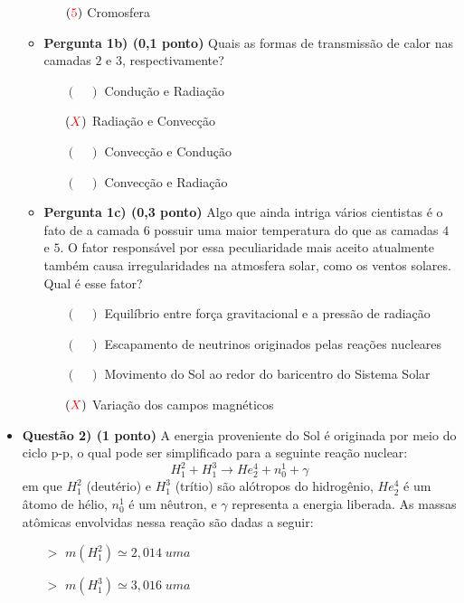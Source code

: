 \documentclass[a4paper, 12pt]{article}
\newcommand{\red}[1]{\textcolor{red}{#1}}
\begin{document}
\begin{flushleft}
\begin{itemize}
\begin{itemize}
\begin{multicols}{2}
\begin{itemize}
						\item[$(\red{5})$] Cromosfera
					\end{itemize} \end{multicols}
				\item \textbf{Pergunta 1b) (0,1 ponto)} Quais as formas de transmissão de calor nas camadas $2$ e $3$, respectivamente?
					\begin{itemize}
						\item[$(\quad)$] Condução e Radiação
						\item[$(\red{X})$] Radiação e Convecção
						\item[$(\quad)$] Convecção e Condução
						\item[$(\quad)$] Convecção e Radiação
					\end{itemize}
				\item \textbf{Pergunta 1c) (0,3 ponto)} Algo que ainda intriga vários cientistas é o fato de a camada $6$ possuir uma maior temperatura do que as camadas $4$ e $5$. O fator responsável por essa peculiaridade mais aceito atualmente também causa irregularidades na atmosfera solar, como os ventos solares. Qual é esse fator?
					\begin{itemize}
						\item[$(\quad)$] Equilíbrio entre força gravitacional e a pressão de radiação
						\item[$(\quad)$] Escapamento de neutrinos originados pelas reações nucleares
						\item[$(\quad)$] Movimento do Sol ao redor do baricentro do Sistema Solar
						\item[$(\red{X})$] Variação dos campos magnéticos
					\end{itemize}
			\end{itemize}
		\item \textbf{Questão 2) (1 ponto)} A energia proveniente do Sol é originada por meio do ciclo p-p, o qual pode ser simplificado para a seguinte reação nuclear:
			$$H_1^2 + H_1^3 \longrightarrow He_2^4 + n_0^1 + \gamma$$
			em que $H_1^2$ (deutério) e $H_1^3$ (trítio) são alótropos do hidrogênio, $He_2^4$ é um âtomo de hélio, $n_0^1$ é um nêutron, e $\gamma$ representa a energia liberada. \linebreak
			As massas atômicas envolvidas nessa reação são dadas a seguir:
				\begin{multicols}{2} \begin{itemize}
					\item[$>$] $m(H_1^2) \simeq 2,014 \; uma$
					\item[$>$] $m(H_1^3) \simeq 3,016 \; uma$

\end{itemize}
\end{multicols}
\end{itemize}
\end{flushleft}
\end{document}
